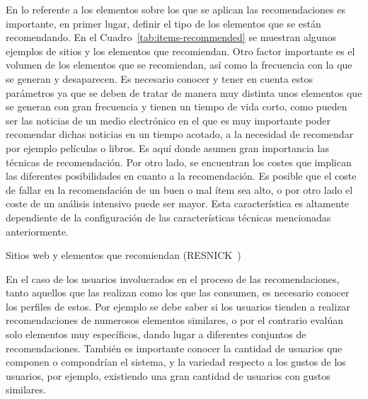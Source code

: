 En lo referente a los elementos sobre los que se aplican las recomendaciones es importante, en primer lugar, definir el tipo de los elementos que se están recomendando. En el Cuadro~\ref{tab:items-recommended} se muestran algunos ejemplos de sitios y los elementos que recomiendan. Otro factor importante es el volumen de los elementos que se recomiendan, así como la frecuencia con la que se generan y desaparecen. Es necesario conocer y tener en cuenta estos parámetros ya que se deben de tratar de manera muy distinta unos elementos que se generan con gran frecuencia y tienen un tiempo de vida corto, como pueden ser las noticias de un medio electrónico en el que es muy importante poder recomendar dichas noticias en un tiempo acotado, a la necesidad de recomendar por ejemplo películas o libros. Es aquí donde asumen gran importancia las técnicas de recomendación. Por otro lado, se encuentran los costes que implican las diferentes posibilidades en cuanto a la recomendación. Es posible que el coste de fallar en la recomendación de un buen o mal ítem sea alto, o por otro lado el coste de un análisis intensivo puede ser mayor. Esta característica es altamente dependiente de la configuración de las características técnicas mencionadas anteriormente.  

\begin{table}[hp]
  \centering
  {\small
  
  }
  \caption[Sitios web y elementos que recomiendan]
  {Sitios web y elementos que recomiendan
    (\textsc{RESNICK}~\cite{Lu})}
  \label{tab:items-recommended}
\end{table}


En el caso de los usuarios involucrados en el proceso de las recomendaciones, tanto aquellos que las realizan como los que las consumen, es necesario conocer los perfiles de estos. Por ejemplo se debe saber si los usuarios tienden a realizar recomendaciones de numerosos elementos similares, o por el contrario evalúan solo elementos muy específicos, dando lugar a diferentes conjuntos de recomendaciones. También es importante conocer la cantidad de usuarios que componen o compondrían el sistema, y la variedad respecto a los gustos de los usuarios, por ejemplo, existiendo una gran cantidad de usuarios con gustos similares.



